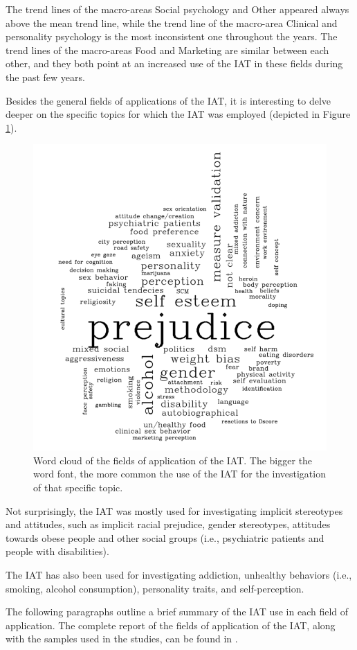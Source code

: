 \documentclass[12pt]{book}
\begin{document}
The trend lines of the macro-areas Social psychology and Other appeared always above the mean trend line, while the trend line of the macro-area Clinical and personality psychology is the most inconsistent one throughout the years. 
The trend lines of the macro-areas Food and Marketing are similar between each other, and they both point at an increased use of the IAT in these fields during the past few years. 

Besides the general fields of applications of the IAT, it is interesting to delve deeper on the specific topics for which the IAT was employed (depicted in Figure \ref{fig:wordcloud}).

\begin{figure}[h!]
	\centering
	\includegraphics[width=0.5\linewidth]{wordcloudtopic.png}
	\caption{\label{fig:wordcloud} Word cloud of the fields of application of the IAT.  The bigger the word font, the more common the use of the IAT for the investigation of that specific topic.}
\end{figure}

Not surprisingly, the IAT was mostly used for investigating  implicit stereotypes and attitudes, such as implicit racial prejudice, gender stereotypes, attitudes towards obese people and other social groups (i.e., psychiatric patients and people with disabilities). 

The IAT has also been used for investigating addiction, unhealthy behaviors (i.e., smoking, alcohol consumption), personality traits, and self-perception.

The following paragraphs outline a brief summary of the IAT use in each field of application. The complete report of the fields of application of the IAT, along with the samples used in the studies, can be found in .
\end{document}
